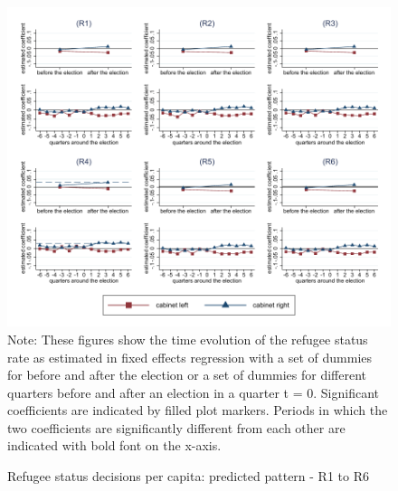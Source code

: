 \documentclass[11pt,a4paper]{scrartcl}
\begin{document}


\clearpage
\FloatBarrier
\begin{figure}[!ht]
	\caption{Refugee status decisions per capita: predicted pattern - R1 to R6}
	\includegraphics[width=1\textwidth]{../results/decisions/refugeestatus_rate_graphs_R1-R6.pdf}
	\scriptsize{Note: These figures show the time evolution of the refugee status rate as estimated in fixed effects regression with a set of dummies for before and after the election or a set of dummies for different quarters before and after an election in a quarter t = 0. Significant coefficients are indicated by filled plot markers. Periods in which the two coefficients are significantly different from each other are indicated with bold font on the x-axis.}
\end{figure}

\clearpage
\FloatBarrier



\clearpage
\FloatBarrier



\clearpage
\FloatBarrier


\end{document}
